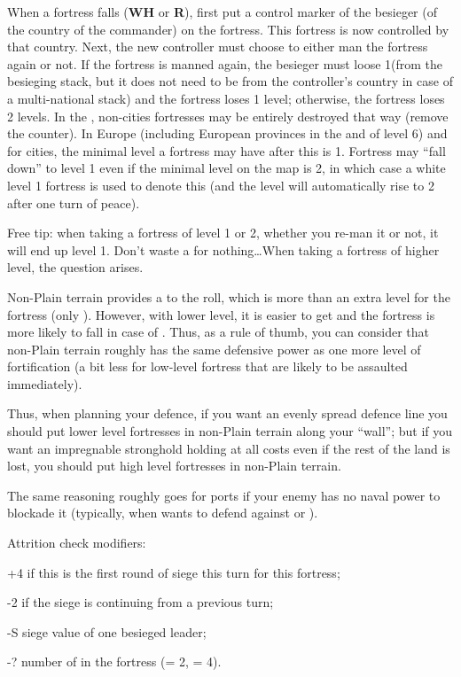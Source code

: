 When a fortress falls (\textbf{WH} or \textbf{R}), first put a control marker
of the besieger (of the country of the commander) on the fortress. This
fortress is now controlled by that country. Next, the new controller must
choose to either man the fortress again or not. If the fortress is manned
again, the besieger must loose 1\LD (from the besieging stack, but it does not
need to be from the controller's country in case of a multi-national stack)
and the fortress loses 1 level; otherwise, the fortress loses 2 levels. In the
\ROTW, non-cities fortresses may be entirely destroyed that way (remove the
counter). In Europe (including European provinces in the \ROTW and \COL of
level 6) and for \ROTW cities, the minimal level a fortress may have after
this is 1. Fortress may ``fall down'' to level 1 even if the minimal level on
the map is 2, in which case a white level 1 fortress is used to denote this
(and the level will automatically rise to 2 after one turn of peace).

\begin{playtip}
  Free tip: when taking a fortress of level 1 or 2, whether you re-man it or
  not, it will end up level 1. Don't waste a \LD for nothing\ldots When taking
  a fortress of higher level, the question arises.
\end{playtip}

\begin{playtip}
  Non-Plain terrain provides a  to the roll, which is more than an
  extra level for the fortress (only ). However, with lower level,
  it is easier to get  and the fortress is more likely
  to fall in case of . Thus, as a rule of thumb, you can
  consider that non-Plain terrain roughly has the same defensive power as one
  more level of fortification (a bit less for low-level fortress that are
  likely to be assaulted immediately).

  Thus, when planning your defence, if you want an evenly spread defence line
  you should put lower level fortresses in non-Plain terrain along your
  ``wall''; but if you want an impregnable stronghold holding at all costs
  even if the rest of the land is lost, you should put high level fortresses
  in non-Plain terrain.

  The same reasoning roughly goes for ports if your enemy has no naval power
  to blockade it (typically, when \SUE wants to defend against \RUS or \POL).
\end{playtip}

Attrition check modifiers:
\begin{modlist}
\item[+4] if this is the first round of siege this turn for this fortress;
\item[-2] if the siege is continuing from a previous turn;
\item[-S] siege value of one besieged leader;
\item[-?] number of \LD in the fortress (\ARMY\facemoins = 2\LD,
  \ARMY\faceplus = 4\LD).
\end{modlist}


